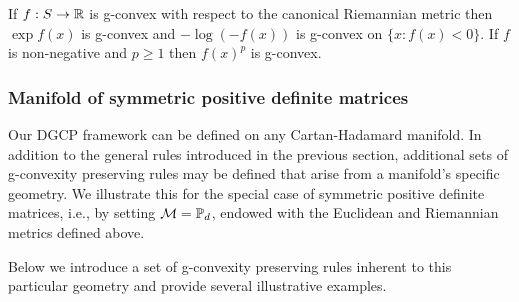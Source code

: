 \documentclass[twoside,11pt]{article}
\begin{document}
\begin{example}
    If $f:S \to \mathbb{R}$ is g-convex with respect to the canonical Riemannian metric then $\exp f(x)$ is g-convex and $- \log (-f(x))$ is g-convex on $\{x : f(x) < 0 \}$. If $f$ is non-negative and $p \geq 1$ then $f(x)^p$ is g-convex.
\end{example}



\subsubsection{Manifold of symmetric positive definite matrices}\label{sec:rules}

Our DGCP framework can be defined on any Cartan-Hadamard manifold. In addition to the general rules introduced in the previous section, additional sets of g-convexity preserving rules may be defined that arise from a manifold's specific geometry. We illustrate this for the special case of symmetric positive definite matrices, i.e., by setting $\mathcal{M} = \mathbb{P}_d$, endowed with the Euclidean and Riemannian metrics defined above. 

Below we introduce a set of g-convexity preserving rules inherent to this particular geometry and provide several illustrative examples. 
\end{document}
